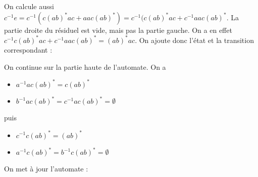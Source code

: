 \begin{example}
On calcule aussi $c^{-1}e = c^{-1}(c(ab)^*ac + aac(ab)^*) = c^{-1}(c(ab)^*ac + c^{-1}aac(ab)^*$. La partie droite du résiduel est vide, mais pas la partie gauche. On a en effet \newline $c^{-1}c(ab)^*ac + c^{-1}aac(ab)^* = (ab)^*ac$. On ajoute donc l'état et la transition correspondant :



\begin{figure}[H]
\centering

\end{figure}

On continue sur la partie haute de l'automate. On a 

\begin{itemize}
\item $a^{-1}ac(ab)^* = c(ab)^*$
\item $b^{-1}ac(ab)^* = c^{-1}ac(ab)^* = \emptyset$
\end{itemize}

puis

\begin{itemize}
\item $c^{-1}c(ab)^* = (ab)^*$
\item $a^{-1}c(ab)^* = b^{-1}c(ab)^* = \emptyset$
\end{itemize}

On met à jour l'automate : 



\end{example}

